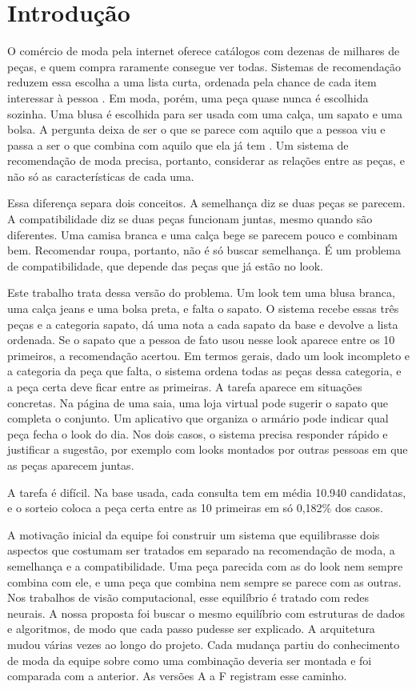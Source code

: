 \documentclass[conference]{IEEEtran}
\begin{document}
\section{Introdução}
O comércio de moda pela internet oferece catálogos com dezenas de milhares de peças, e quem compra raramente consegue ver todas. Sistemas de recomendação reduzem essa escolha a uma lista curta, ordenada pela chance de cada item interessar à pessoa \cite{deshpande2004}. Em moda, porém, uma peça quase nunca é escolhida sozinha. Uma blusa é escolhida para ser usada com uma calça, um sapato e uma bolsa. A pergunta deixa de ser o que se parece com aquilo que a pessoa viu e passa a ser o que combina com aquilo que ela já tem \cite{han2017,vasileva2018}. Um sistema de recomendação de moda precisa, portanto, considerar as relações entre as peças, e não só as características de cada uma.

Essa diferença separa dois conceitos. A semelhança diz se duas peças se parecem. A compatibilidade diz se duas peças funcionam juntas, mesmo quando são diferentes. Uma camisa branca e uma calça bege se parecem pouco e combinam bem. Recomendar roupa, portanto, não é só buscar semelhança. É um problema de compatibilidade, que depende das peças que já estão no look.

Este trabalho trata dessa versão do problema. Um look tem uma blusa branca, uma calça jeans e uma bolsa preta, e falta o sapato. O sistema recebe essas três peças e a categoria sapato, dá uma nota a cada sapato da base e devolve a lista ordenada. Se o sapato que a pessoa de fato usou nesse look aparece entre os 10 primeiros, a recomendação acertou. Em termos gerais, dado um look incompleto e a categoria da peça que falta, o sistema ordena todas as peças dessa categoria, e a peça certa deve ficar entre as primeiras. A tarefa aparece em situações concretas. Na página de uma saia, uma loja virtual pode sugerir o sapato que completa o conjunto. Um aplicativo que organiza o armário pode indicar qual peça fecha o look do dia. Nos dois casos, o sistema precisa responder rápido e justificar a sugestão, por exemplo com looks montados por outras pessoas em que as peças aparecem juntas.

A tarefa é difícil. Na base usada, cada consulta tem em média 10.940 candidatas, e o sorteio coloca a peça certa entre as 10 primeiras em só 0,182\% dos casos.

A motivação inicial da equipe foi construir um sistema que equilibrasse dois aspectos que costumam ser tratados em separado na recomendação de moda, a semelhança e a compatibilidade. Uma peça parecida com as do look nem sempre combina com ele, e uma peça que combina nem sempre se parece com as outras. Nos trabalhos de visão computacional, esse equilíbrio é tratado com redes neurais. A nossa proposta foi buscar o mesmo equilíbrio com estruturas de dados e algoritmos, de modo que cada passo pudesse ser explicado. A arquitetura mudou várias vezes ao longo do projeto. Cada mudança partiu do conhecimento de moda da equipe sobre como uma combinação deveria ser montada e foi comparada com a anterior. As versões A a F registram esse caminho.
\end{document}
